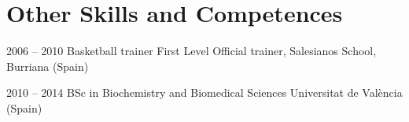 \documentclass{tccv}
\begin{document}
\section{Other Skills and Competences}

\begin{yearlist}
	
	\item{2006 -- 2010}
	{Basketball trainer}
	{First Level Official trainer, Salesianos School, Burriana (Spain)}
	
	\item{2010 -- 2014}
	{BSc in Biochemistry and Biomedical Sciences}
	{Universitat de València (Spain)}
	
\end{yearlist}
\end{document}
